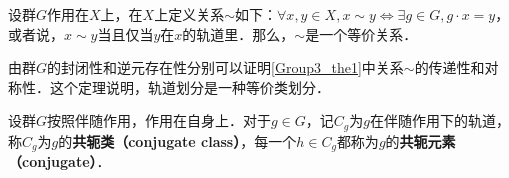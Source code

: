 \begin{theorem}{}\label{Group3_the1}
设群$G$作用在$X$上，在$X$上定义关系$\sim$如下：$\forall x, y\in X, x\sim y \iff \exists g\in G, g\cdot x=y$，或者说，$x\sim y$当且仅当$y$在$x$的轨道里．那么，$\sim$是一个等价关系．
\end{theorem}

由群$G$的封闭性和逆元存在性分别可以证明\autoref{Group3_the1}中关系$\sim$的传递性和对称性．这个定理说明，轨道划分是一种等价类划分．

\begin{definition}{}
设群$G$按照伴随作用，作用在自身上．对于$g\in G$，记$C_g$为$g$在伴随作用下的轨道，称$C_g$为$g$的\textbf{共轭类（conjugate class）}，每一个$h\in C_g$都称为$g$的\textbf{共轭元素（conjugate）}．
\end{definition}